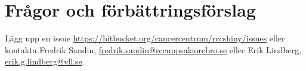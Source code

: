 \documentclass[12pt, a4paper,twoside]{report}
\begin{document}
\section{Frågor och förbättringsförslag}
Lägg upp en issue \url{https://bitbucket.org/cancercentrum/rccshiny/issues} eller kontakta Fredrik Sandin, \href{mailto:fredrik.sandin@rccuppsalaorebro.se}{fredrik.sandin@rccuppsalaorebro.se} eller Erik Lindberg, \href{mailto:erik.g.lindberg@vll.se}{erik.g.lindberg@vll.se}.
\end{document}
